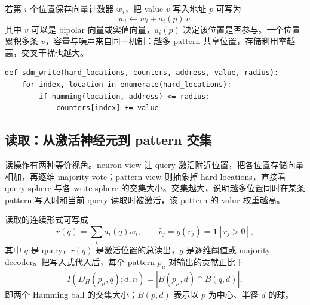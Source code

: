 


若第 $i$ 个位置保存向量计数器 $w_i$，把 value $v$ 写入地址 $p$ 可写为
$$
w_i\leftarrow w_i+a_i(p)\,v.
$$
其中 $v$ 可以是 bipolar 向量或实值向量，$a_i(p)$ 决定该位置是否参与。一个位置累积多条 $v$，容量与噪声来自同一机制：越多 pattern 共享位置，存储利用率越高，交叉干扰也越大。

\begin{lstlisting}[caption={SDM 的分布式写入（概念伪代码）}]
def sdm_write(hard_locations, counters, address, value, radius):
    for index, location in enumerate(hard_locations):
        if hamming(location, address) <= radius:
            counters[index] += value
\end{lstlisting}


\subsection{读取：从激活神经元到 pattern 交集}

读操作有两种等价视角。neuron view 让 query 激活附近位置，把各位置存储向量相加，再逐维 majority vote；pattern view 则抽象掉 hard locations，直接看 query sphere 与各 write sphere 的交集大小。交集越大，说明越多位置同时在某条 pattern 写入时和当前 query 读取时被激活，该 pattern 的 value 权重越高。




读取的连续形式可写成
$$
r(q)=\sum_i a_i(q)w_i,
\qquad
\hat v_j=g(r_j)=\mathbf{1}[r_j>0],
$$
其中 $q$ 是 query，$r(q)$ 是激活位置的总读出，$g$ 是逐维阈值或 majority decoder。把写入式代入后，每个 pattern $p_\mu$ 对输出的贡献正比于
$$
I\!\left(D_H(p_\mu,q);d,n\right)
=\left|B(p_\mu,d)\cap B(q,d)\right|,
$$
即两个 Hamming ball 的交集大小；$B(p,d)$ 表示以 $p$ 为中心、半径 $d$ 的球。

